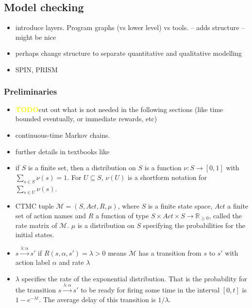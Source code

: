 \documentclass[a4paper, 10pt]{article}
\def \todo{\textbf{\textcolor{yellow}{TODO}}}
\begin{document}
\begin{enumerate}
\subsection{Model checking}
\label{ssec:analysis-modelchecking}
\begin{itemize}
	\item introduce layers. Program graphs (vs lower level) vs tools. -- adds structure -- might be nice
	\item perhaps change structure to separate quantitative and qualitative modelling
	\item SPIN\cite{spin}\cite{hol97}, PRISM\cite{prism}\cite{knp09}
\end{itemize}

\subsubsection{Preliminaries}
\label{sssec:analysis-modelchecking-preliminaries}
\begin{itemize}
	\item \todo cut out what is not needed in the following sections (like time bounded eventually, or immediate rewards, etc)
	\item continuous-time Markov chains.
	\item further details in textbooks like \cite{kul95, ks76}
	\item if $S$ is a finite set, then a distribution on $S$ is a function $\nu:S \rightarrow [0,1]$ with $\sum\limits_{s \in S} \nu (s) = 1$. For $U \subseteq S$, $\nu (U)$ is a shortform notation for $\sum\limits_{s \in U} \nu (s)$.
	\item CTMC tuple $\mathcal{M} = (S, \mathit{Act}, R, \mu)$, where $S$ is a finite state space, $Act$ a finite set of action names and $R$ a function of type $S \times \mathit{Act} \times S \rightarrow \mathbb{R}_{\ge 0}$, called the rate matrix of $\mathcal{M}$. $\mu$ is a distribution on $S$ specifying the probabilities for the initial states.
	\item $s \xrightarrow{\lambda : \alpha} s'$ if $R(s, \alpha, s') = \lambda > 0$ means $\mathcal{M}$ has a transition from $s$ to $s'$ with action label $\alpha$ and rate $\lambda$
	\item $\lambda$ specifies the rate of the exponential distribution. That is the probability for the transition $s \xrightarrow{\lambda : \alpha} s'$ to be ready for firing some time in the interval $[0,t]$ is $1-e^{- \lambda t}$. The average delay  of this transition is $1 / \lambda$.

\end{itemize}
\end{enumerate}
\end{document}
